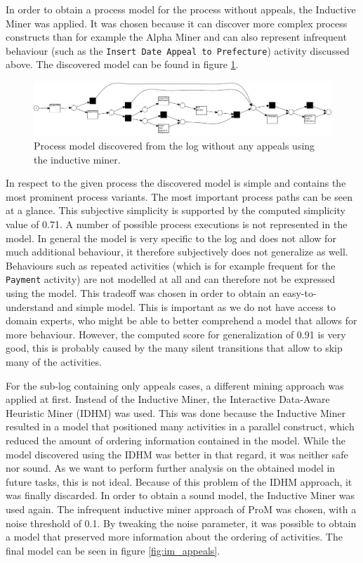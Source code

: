 \documentclass[12pt]{report}
\begin{document}
In order to obtain a process model for the process without appeals, the Inductive Miner was applied. It was chosen because it can discover more complex process constructs than for example the Alpha Miner and can also represent infrequent behaviour (such as the \texttt{Insert Date Appeal to Prefecture}) activity discussed above. The discovered model can be found in figure \ref{fig:im_no_appeals}.
\begin{figure}[H]
  \centering
  \includegraphics[width=\textwidth]{figures/im_no_appeals.png}
  \caption{Process model discovered from the log without any appeals using the inductive miner.}
  \label{fig:im_no_appeals}
\end{figure}
In respect to the given process the discovered model is simple and contains the most prominent process variants. The most important process paths can be seen at a glance. This subjective simplicity is supported by the computed simplicity value of 0.71. A number of possible process executions is not represented in the model. In general the model is very specific to the log and does not allow for much additional behaviour, it therefore subjectively does not generalize as well. Behaviours such as repeated activities (which is for example frequent for the \texttt{Payment} activity) are not modelled at all and can therefore not be expressed using the model. This tradeoff was chosen in order to obtain an easy-to-understand and simple model. This is important as we do not have access to domain experts, who might be able to better comprehend a model that allows for more behaviour.  However, the computed score for generalization of 0.91 is very good, this is probably caused by the many silent transitions that allow to skip many of the activities. 

For the sub-log containing only appeals cases, a different mining approach was applied at first. Instead of the Inductive Miner, the Interactive Data-Aware Heuristic Miner (IDHM) was used. This was done because the Inductive Miner resulted in a model that positioned many activities in a parallel construct, which reduced the amount of ordering information contained in the model. While the model discovered using the IDHM was better in that regard, it was neither safe nor sound. As we want to perform further analysis on the obtained model in future tasks, this is not ideal. Because of this problem of the IDHM approach, it was finally discarded. In order to obtain a sound model, the Inductive Miner was used again. The infrequent inductive miner approach of ProM was chosen, with a noise threshold of 0.1. By tweaking the noise parameter, it was possible to obtain a model that preserved more information about the ordering of activities. The final model can be seen in figure \ref{fig:im_appeals}.
\end{document}
